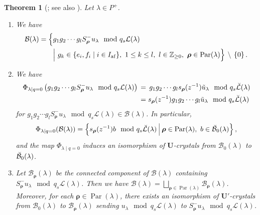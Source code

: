 \documentclass[10pt]{amsart}
\newtheorem{theo}{Theorem}[section]
\theoremstyle{definition}\newtheorem{defi}[theo]{Definition}
\theoremstyle{remark}\newtheorem{rema}[theo]{Remark}
\newcommand{\BZ}{\mathbb{Z}}
\newcommand\bmrho[1]{\boldsymbol{#1}}
\newcommand{\U}{\mathbf{U}}
\DeclareMathOperator{\af}{af}
\DeclareMathOperator{\Par}{Par}
\begin{document}
\begin{theo}[{\cite[\S~4.2]{BN04}}; see also {\cite[\S~13]{K02}}] \label{thm:BN}
Let $\lambda \in P^+$. 
\begin{enumerate}[label=(\arabic*)]
\item\label{Theo2.1_1}
We have
\begin{equation}
\begin{aligned}
\mathcal{B}(\lambda)
=
\Bigl\{ 
&g_1 g_2 \cdots g_l S_{\bmrho{\rho}}^- u_{\lambda} 
\mod q_s \mathcal{L}(\lambda)
 \\%
&
\Bigl|\ g_k \in \{ e_i , f_i \mid i \in I_{\af} \} , \ 
1 \leq k \leq l , \ 
l \in \BZ_{\geq 0}, \ 
\bmrho{\rho} \in \Par (\lambda) 
\Bigr\} 
\, \setminus \, 
\left\{ 0 \right\} .
\end{aligned}
\end{equation}
\item\label{Theo2.1_2}
We have 
\begin{equation}
\label{eq:Phi_q=0}
\begin{aligned} 
\Phi_{\lambda \mid q=0} \left( g_1 g_2 \cdots g_l S_{\bmrho{\rho}}^- u_{\lambda} 
\mod q_s \mathcal{L}(\lambda) \right) 
\, &= \, 
g_1 g_2 \cdots g_l s_{\bmrho{\rho}}(z^{-1}) \Tilde{u}_{\lambda} 
\mod q_s \Breve{\mathcal{L}}(\lambda) \\%
&= 
s_{\bmrho{\rho}}(z^{-1}) g_1 g_2 \cdots g_l \Tilde{u}_{\lambda} 
\mod q_s \Breve{\mathcal{L}}(\lambda)
\end{aligned}
\end{equation}
for 
$g_1 g_2 \cdots g_l S_{\bmrho{\rho}}^- u_{\lambda} 
\mod q_s \mathcal{L}(\lambda)
\in \mathcal{B}(\lambda)$. 
In particular, 
\begin{align}
\Phi_{\lambda \mid q=0} (\mathcal{B}(\lambda))
=
\left\{ 
s_{\bmrho{\rho}}(z^{-1})b 
\mod q_s \Breve{\mathcal{L}}(\lambda)
\ \vline \ 
\bmrho{\rho} \in \Par (\lambda) , \ 
b \in \Breve{\mathcal{B}}_0(\lambda) 
\right\} ,
\end{align}
and the map 
$\Phi_{\lambda \mid q=0}$
induces an isomorphism of $\U$-crystals from
$\mathcal{B}_0(\lambda)$
to $\Breve{\mathcal{B}}_0(\lambda)$.
\item\label{Theo2.1_3}
Let 
$\mathcal{B}_{\bmrho{\rho}}(\lambda)$
be the connected component of $\mathcal{B}(\lambda)$ containing
$S_{\bmrho{\rho}}^- u_{\lambda} \mod q_s \mathcal{L}(\lambda)$. 
Then we have 
$\mathcal{B}(\lambda) = \bigsqcup_{\bmrho{\rho} \in \Par (\lambda)} \mathcal{B}_{\bmrho{\rho}}(\lambda)$.
Moreover, 
for each 
$\bmrho{\rho} \in \Par (\lambda)$, 
there exists an isomorphism of $\U'$-crystals from
$\mathcal{B}_0(\lambda)$
to
$\mathcal{B}_{\bmrho{\rho}}(\lambda)$
sending
$u_{\lambda} \mod q_s \mathcal{L}(\lambda)$
to
$S_{\bmrho{\rho}}^- u_{\lambda} \mod q_s \mathcal{L}(\lambda)$.
\end{enumerate}
\end{theo}
\end{document}
